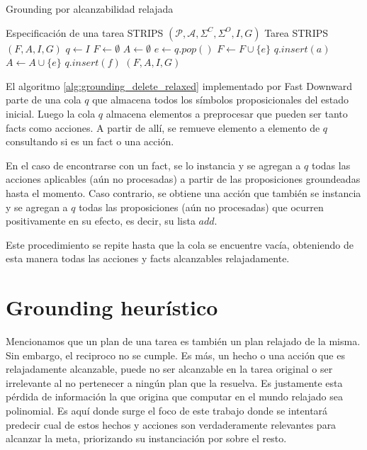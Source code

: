 \begin{algorithm}
    \caption{Grounding por alcanzabilidad
    relajada}\label{alg:grounding_delete_relaxed}
    \begin{algorithmic}
    \Require Especificación de una tarea STRIPS $(\mathcal{P}, \mathcal{A},
    \Sigma^{C}, \Sigma^{O}, I, G)$
    \Ensure Tarea STRIPS $(F, A, I, G)$ 
    \State $q \gets I$
    \State $F \gets \emptyset$
    \State $A \gets \emptyset$
    \State $e \gets q.pop()$
        \State $F \gets F \cup \{e\}$
            \State $q.insert(a)$
        \EndFor
    \Else
        \State $A \gets A \cup \{e\}$
            \State $q.insert(f)$
        \EndFor
    \EndIf
    \EndWhile
    \State \Return $(F, A, I, G)$
    \end{algorithmic}
\end{algorithm}

El algoritmo \ref{alg:grounding_delete_relaxed} implementado por Fast Downward
parte de una cola $q$ que almacena todos los símbolos proposicionales del estado
inicial. Luego la cola $q$ almacena elementos a preprocesar que pueden ser tanto facts como acciones. A partir de allí, se remueve elemento a elemento de $q$ consultando si
es un fact o una acción.

En el caso de encontrarse con un fact, se lo instancia y se agregan a $q$ todas
las acciones aplicables (aún no procesadas) a partir de las proposiciones
groundeadas hasta el momento. Caso contrario, se obtiene una acción que también
se instancia y se agregan a $q$ todas las proposiciones (aún no procesadas) que
ocurren positivamente en su efecto, es decir, su lista $add$.

Este procedimiento se repite hasta que la cola se encuentre vacía, obteniendo de esta manera todas las acciones y facts alcanzables relajadamente.

\section{Grounding heurístico}
\label{lit:heuristic_grounding}

Mencionamos que un plan de una tarea es también un plan relajado de la misma.
Sin embargo, el reciproco no se cumple. Es más, un hecho o una acción que es
relajadamente alcanzable, puede no ser alcanzable en la tarea original o ser
irrelevante al no pertenecer a ningún plan que la resuelva. Es justamente esta
pérdida de información la que origina que computar en el mundo relajado sea
polinomial. Es aquí donde surge el foco de este trabajo donde se intentará
predecir cual de estos hechos y acciones son verdaderamente relevantes para
alcanzar la meta, priorizando su instanciación por sobre el resto.

